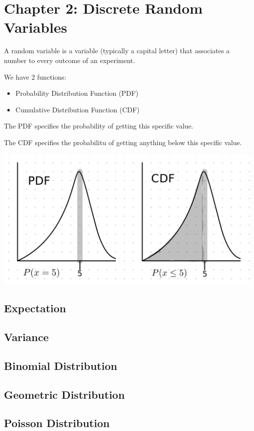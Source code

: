 \documentclass[12pt,letterpaper]{article} \usepackage{amsmath} \usepackage{graphicx} \usepackage[margin=1in]{geometry} \usepackage{longtable}  \usepackage{amssymb}
\begin{document}
	\section{Chapter 2: Discrete Random Variables}
	A random variable is a variable (typically a capital letter) that associates a number to every outcome of an experiment. 
	
	We have 2 functions:
	\begin{itemize}
		\item Probability Distribution Function (PDF)
		\item Cumulative Distribution Function (CDF)
	\end{itemize}

	The PDF specifies the probability of getting this specific value. 
	
	The CDF specifies the probabilitu of getting anything below this specific value. 
	\begin{center}
		\includegraphics[width=0.7\linewidth]{pdf-vs-cdf}
	\end{center}
	
	
	\subsection{Expectation}
	
	\subsection{Variance}
	
	\subsection{Binomial Distribution}
	
	\subsection{Geometric Distribution}
	
	\subsection{Poisson Distribution}
	
\end{document}
